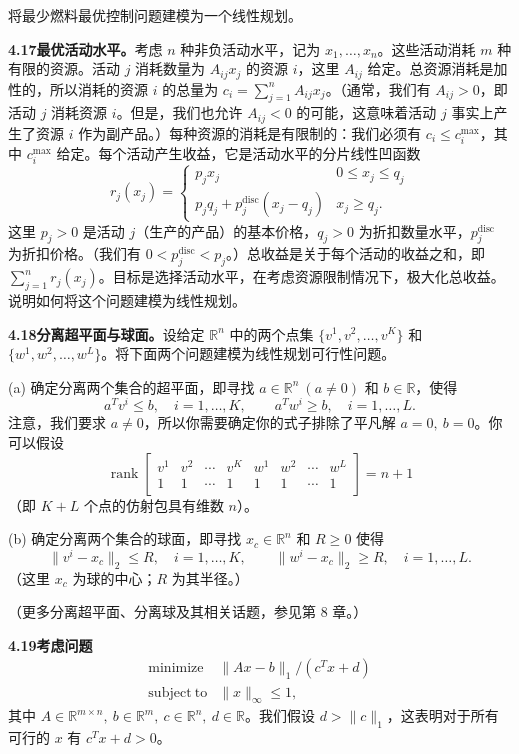\documentclass[UTF8,12pt,a4paper,fontset=fandol]{ctexart}
\begin{document}
将最少燃料最优控制问题建模为一个线性规划。

\noindent\textbf{4.17\quad 最优活动水平。}\quad 考虑 $n$ 种非负活动水平，记为 $x_1,\ldots,x_n$。这些活动消耗 $m$ 种有限的资源。活动 $j$ 消耗数量为 $A_{ij}x_j$ 的资源 $i$，这里 $A_{ij}$ 给定。总资源消耗是加性的，所以消耗的资源 $i$ 的总量为 $c_i=\sum_{j=1}^n A_{ij}x_j$。（通常，我们有 $A_{ij}>0$，即活动 $j$ 消耗资源 $i$。但是，我们也允许 $A_{ij}<0$ 的可能，这意味着活动 $j$ 事实上产生了资源 $i$ 作为副产品。）每种资源的消耗是有限制的：我们必须有 $c_i\leq c_i^{\max}$，其中 $c_i^{\max}$ 给定。每个活动产生收益，它是活动水平的分片线性凹函数
\[
r_j(x_j)=
\begin{cases}
p_jx_j & 0\leq x_j\leq q_j\\
p_jq_j+p_j^{\mathrm{disc}}(x_j-q_j) & x_j\geq q_j.
\end{cases}
\]
这里 $p_j>0$ 是活动 $j$（生产的产品）的基本价格，$q_j>0$ 为折扣数量水平，$p_j^{\mathrm{disc}}$ 为折扣价格。（我们有 $0<p_j^{\mathrm{disc}}<p_j$。）总收益是关于每个活动的收益之和，即 $\sum_{j=1}^n r_j(x_j)$。目标是选择活动水平，在考虑资源限制情况下，极大化总收益。说明如何将这个问题建模为线性规划。

\noindent\textbf{4.18\quad 分离超平面与球面。}\quad 设给定 $\mathbb{R}^n$ 中的两个点集 $\{v^1,v^2,\ldots,v^K\}$ 和 $\{w^1,w^2,\ldots,w^L\}$。将下面两个问题建模为线性规划可行性问题。

(a) 确定分离两个集合的超平面，即寻找 $a\in\mathbb{R}^n\ (a\neq0)$ 和 $b\in\mathbb{R}$，使得
\[
a^Tv^i\leq b,\quad i=1,\ldots,K,\qquad a^Tw^i\geq b,\quad i=1,\ldots,L.
\]
注意，我们要求 $a\neq0$，所以你需要确定你的式子排除了平凡解 $a=0,\ b=0$。你可以假设
\[
\operatorname{rank}\begin{bmatrix}
v^1 & v^2 & \cdots & v^K & w^1 & w^2 & \cdots & w^L\\
1 & 1 & \cdots & 1 & 1 & 1 & \cdots & 1
\end{bmatrix}=n+1
\]
（即 $K+L$ 个点的仿射包具有维数 $n$）。

(b) 确定分离两个集合的球面，即寻找 $x_c\in\mathbb{R}^n$ 和 $R\geq0$ 使得
\[
\|v^i-x_c\|_2\leq R,\quad i=1,\ldots,K,\qquad \|w^i-x_c\|_2\geq R,\quad i=1,\ldots,L.
\]
（这里 $x_c$ 为球的中心；$R$ 为其半径。）

（更多分离超平面、分离球及其相关话题，参见第 8 章。）

\noindent\textbf{4.19\quad 考虑问题}
\[
\begin{array}{ll}
\mathop{\mathrm{minimize}} & \|Ax-b\|_1/(c^Tx+d)\\
\mathrm{subject\ to} & \|x\|_\infty\leq1,
\end{array}
\]
其中 $A\in\mathbb{R}^{m\times n},\ b\in\mathbb{R}^m,\ c\in\mathbb{R}^n,\ d\in\mathbb{R}$。我们假设 $d>\|c\|_1$，这表明对于所有可行的 $x$ 有 $c^Tx+d>0$。
\end{document}
